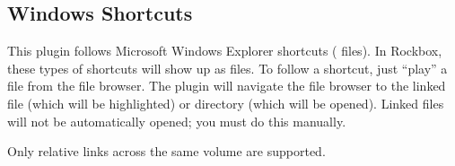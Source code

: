 \subsection{Windows Shortcuts}
\label{ref:Winshortcutsplugin}

This plugin follows Microsoft Windows Explorer shortcuts ( files).
In Rockbox, these types of shortcuts will show up as  files. To
follow a shortcut, just ``play'' a  file from the file browser.
The plugin will navigate the file browser to the linked file (which
will be highlighted) or directory (which will be opened). Linked files will
not be automatically opened; you must do this manually.

Only relative links across the same volume are supported.

